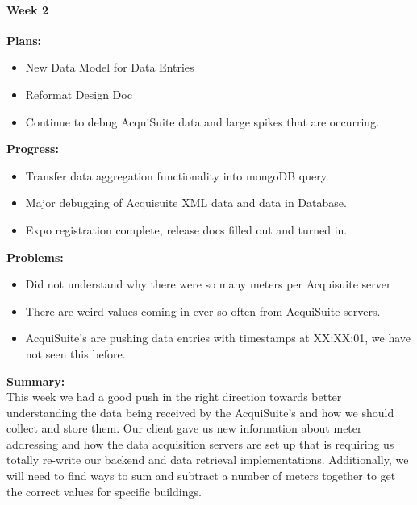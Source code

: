\paragraph{Week 2}
\begin{adjustwidth}{2.5em}{0pt}
    \vspace{-0.5cm}\textbf{Plans:}
    \vspace{-0.5cm}
    \begin{itemize}
        \item New Data Model for Data Entries
        \item Reformat Design Doc
        \item Continue to debug AcquiSuite data and large spikes that are occurring.
    \end{itemize} 
    \vspace{-0.3cm}\textbf{Progress:}
    \vspace{-0.5cm}
    \begin{itemize}
        \item Transfer data aggregation functionality into mongoDB query. %
        \item Major debugging of Acquisuite XML data and data in Database.
        \item Expo registration complete, release docs filled out and turned in. 
    \end{itemize} 
    \vspace{-0.3cm}\textbf{Problems:}
    \vspace{-0.5cm}
    \begin{itemize}
        \item Did not understand why there were so many meters per Acquisuite server
        \item There are weird values coming in ever so often from AcquiSuite servers.
        \item AcquiSuite's are pushing data entries with timestamps at XX:XX:01, we have not seen this before.
    \end{itemize}  
    \vspace{-0.3cm}\noindent\textbf{Summary:}\\
    \noindent This week we had a good push in the right direction towards better understanding the data being received by the AcquiSuite's and how we should collect and store them. Our client gave us new information about meter addressing and how the data acquisition servers are set up that is requiring us totally re-write our backend and data retrieval implementations. Additionally, we will need to find ways to sum and subtract a number of meters together to get the correct values for specific buildings. 
\end{adjustwidth} 
